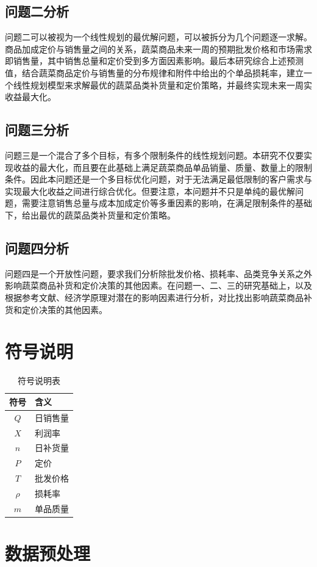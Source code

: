 \documentclass{article}
\begin{document}
\subsection{问题二分析}
问题二可以被视为一个线性规划的最优解问题，可以被拆分为几个问题逐一求解。商品加成定价与销售量之间的关系，蔬菜商品未来一周的预期批发价格和市场需求即销售量，其中销售总量和定价受到多方面因素影响。最后本研究综合上述预测值，结合蔬菜商品定价与销售量的分布规律和附件中给出的个单品损耗率，建立一个线性规划模型来求解最优的蔬菜品类补货量和定价策略，并最终实现未来一周实收益最大化。

\subsection{问题三分析}
问题三是一个混合了多个目标，有多个限制条件的线性规划问题。本研究不仅要实现收益的最大化，而且要在此基础上满足蔬菜商品单品销量、质量、数量上的限制条件。因此本问题还是一个多目标优化问题，对于无法满足最低限制的客户需求与实现最大化收益之间进行综合优化。但要注意，本问题并不只是单纯的最优解问题，需要注意销售总量与成本加成定价等多重因素的影响，在满足限制条件的基础下，给出最优的蔬菜品类补货量和定价策略。
\subsection{问题四分析}
问题四是一个开放性问题，要求我们分析除批发价格、损耗率、品类竞争关系之外影响蔬菜商品补货和定价决策的其他因素。在问题一、二、三的研究基础上，以及根据参考文献、经济学原理对潜在的影响因素进行分析，对比找出影响蔬菜商品补货和定价决策的其他因素。
\section{符号说明}
\begin{table}[H]
\centering
\caption{符号说明表}
\begin{tabular}{|c|l|}
\hline
符号 & 含义 \\
\hline
$Q$ & 日销售量 \\
$X$ & 利润率 \\
$n$ & 日补货量 \\
$P$ & 定价 \\
$T$ & 批发价格 \\ 
$\rho$ & 损耗率 \\
$m$ & 单品质量 \\
\hline
\end{tabular}
\end{table}
\section{数据预处理}
\end{document}
